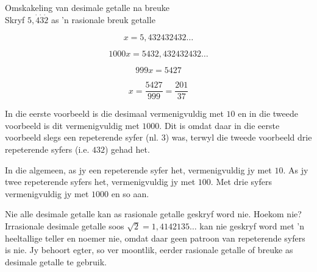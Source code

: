 \begin{wex}
{%
Omskakeling van desimale getalle na breuke
}
{%
\\Skryf $5,\dot{4}\dot{3}\dot{2}$ as 'n rasionale breuk getalle
}
{%


$$ x = 5,432432432\ldots $$


$$ 1000x = 5432,432432432\ldots $$


$$ 999x = 5427 $$


$$ x = \dfrac{5427}{999} = \dfrac{201}{37} $$

}
\end{wex}

In die eerste voorbeeld is die desimaal vermenigvuldig met $10$  en in die tweede voorbeeld is dit vermenigvuldig met $1000$. Dit is omdat daar in die eerste voorbeeld slegs een repeterende syfer (nl. $3$) was, terwyl die tweede voorbeeld drie repeterende syfers (i.e. $432$) gehad het.\par 
In die algemeen, as jy een repeterende syfer het, vermenigvuldig jy met $10$.  As jy twee repeterende syfers het,
vermenigvuldig jy met $100$.  Met drie syfers vermenigvuldig jy met $1000$ en so aan.\par

Nie alle desimale getalle kan as rasionale getalle geskryf word nie. Hoekom nie? Irrasionale desimale getalle soos
$\sqrt{2}=1,4142135\ldots$
kan nie geskryf word met ’n heeltallige teller en noemer nie, omdat daar geen patroon van repeterende syfers is nie. Jy behoort egter, so ver moontlik, eerder rasionale getalle of breuke as desimale getalle te gebruik.






